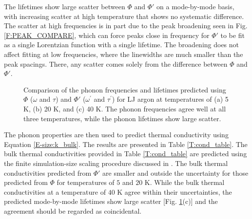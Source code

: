 The lifetimes show large scatter between $\Phi$ and $\Phi'$ on a 
mode-by-mode basis, with increasing 
scatter at high temperature that shows no systematic difference. The 
scatter at high frequencies 
is in part due to the peak broadening seen in Fig$.$ \ref{F:PEAK_COMPARE}, 
which can force peaks 
close in frequency for $\Phi'$ to be fit as a single Lorentzian function 
with a single lifetime. 
The broadening does not affect fitting at low frequencies, where the 
linewidths are much smaller 
than the peak spacings. There, any scatter comes solely from the difference 
between $\Phi$ and $\Phi'$.
\begin{figure}
\begin{center}
\end{center}
\caption{\label{F:FREQ_LIFE_LJ} Comparison of the phonon frequencies and 
lifetimes predicted using 
$\Phi$ ($\omega$ and $\tau$) and $\Phi'$ ($\omega^{'}$ and $\tau^{'}$) for 
LJ argon at temperatures 
of (a) 5 K, (b) 20 K, and (c) 40 K. The phonon frequencies agree well at 
all three temperatures, 
while the phonon lifetimes show large scatter.}
\end{figure}
\clearpage

The phonon properties are then used to predict thermal conductivity using 
Equation 
\eqref{E-size:k_bulk}. The results are presented in Table 
\ref{T:cond_table}. The bulk thermal 
conductivities provided in Table \ref{T:cond_table} are predicted using 
the finite simulation-size 
scaling procedure discussed in \cite{turney_predicting_2009}. The bulk 
thermal conductivities predicted from 
$\Phi'$ are smaller and outside the uncertainty for those predicted from 
$\Phi$ for temperatures of 
$5$ and $20$ K. While the bulk thermal conductivities at a temperature of 
$40$ K agree within their 
uncertainties, the predicted mode-by-mode lifetimes show large scatter 
[Fig$.$ \ref{F:FREQ_LIFE_LJ}(c)] 
and the agreement should be regarded as coincidental.

